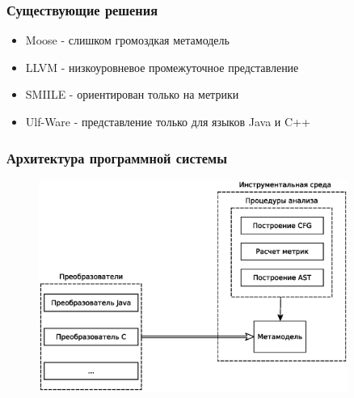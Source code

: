 \documentclass[handout]{beamer}
\begin{document}
\begin{frame}
\frametitle{Существующие решения}

\begin{itemize}
    \item Moose - слишком громоздкая метамодель
    \item LLVM - низкоуровневое промежуточное представление
    \item SMIILE - ориентирован только на метрики
    \item Ulf-Ware - представление только для языков Java и C++
\end{itemize}

\end{frame}
\begin{frame}
\frametitle{Архитектура программной системы}

\begin{figure}[b!]
    \begin{center}
        \includegraphics[width=0.9\textwidth]{fig/arch.eps}
    \end{center}
\end{figure}

\end{frame}
\end{document}
